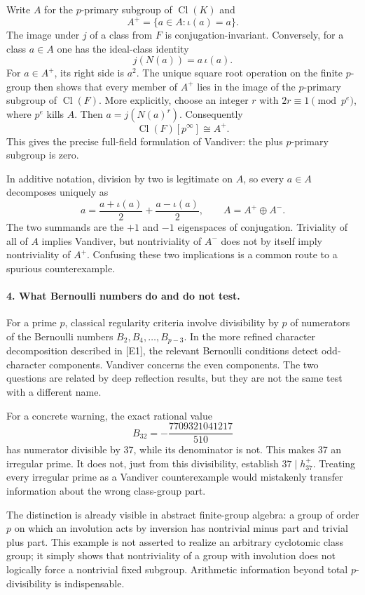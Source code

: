 \documentclass[11pt]{article}
\begin{document}
Write $A$ for the $p$-primary subgroup of $\operatorname{Cl}(K)$ and
\[
 A^+=\{a\in A:\iota(a)=a\}.
\]
The image under $j$ of a class from $F$ is conjugation-invariant. Conversely, for a class $a\in A$ one has the ideal-class identity
\[
 j(N(a))=a\,\iota(a).
\]
For $a\in A^+$, its right side is $a^2$. The unique square root operation on the finite $p$-group then shows that every member of $A^+$ lies in the image of the $p$-primary subgroup of $\operatorname{Cl}(F)$. More explicitly, choose an integer $r$ with $2r\equiv1\pmod{p^e}$, where $p^e$ kills $A$. Then $a=j(N(a)^r)$. Consequently
\[
 \operatorname{Cl}(F)[p^\infty]\cong A^+.
\]
This gives the precise full-field formulation of Vandiver: the plus $p$-primary subgroup is zero.

In additive notation, division by two is legitimate on $A$, so every $a\in A$ decomposes uniquely as
\[
 a=\frac{a+\iota(a)}2+\frac{a-\iota(a)}2,
 \qquad A=A^+\oplus A^-.
\]
The two summands are the $+1$ and $-1$ eigenspaces of conjugation. Triviality of all of $A$ implies Vandiver, but nontriviality of $A^-$ does not by itself imply nontriviality of $A^+$. Confusing these two implications is a common route to a spurious counterexample.

\paragraph{4. What Bernoulli numbers do and do not test.}
For a prime $p$, classical regularity criteria involve divisibility by $p$ of numerators of the Bernoulli numbers $B_2,B_4,\ldots,B_{p-3}$. In the more refined character decomposition described in [E1], the relevant Bernoulli conditions detect odd-character components. Vandiver concerns the even components. The two questions are related by deep reflection results, but they are not the same test with a different name.

For a concrete warning, the exact rational value
\[
 B_{32}=-\frac{7709321041217}{510}
\]
has numerator divisible by 37, while its denominator is not. This makes 37 an irregular prime. It does not, just from this divisibility, establish $37\mid h_{37}^+$. Treating every irregular prime as a Vandiver counterexample would mistakenly transfer information about the wrong class-group part.

The distinction is already visible in abstract finite-group algebra: a group of order $p$ on which an involution acts by inversion has nontrivial minus part and trivial plus part. This example is not asserted to realize an arbitrary cyclotomic class group; it simply shows that nontriviality of a group with involution does not logically force a nontrivial fixed subgroup. Arithmetic information beyond total $p$-divisibility is indispensable.
\end{document}
